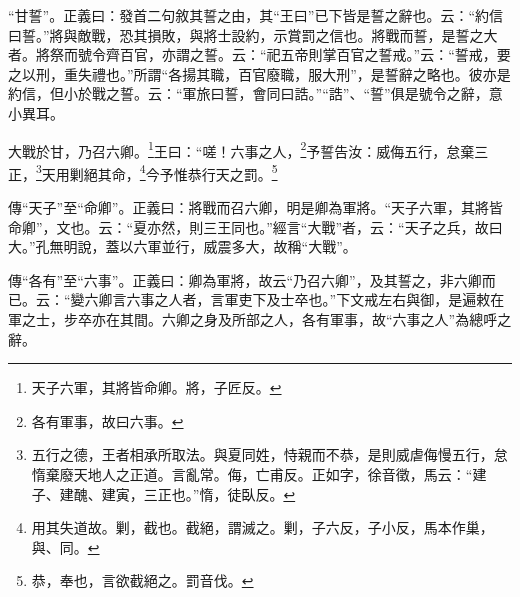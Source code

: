 {\noindent\shu{}\fzkt “甘誓”。正義曰：發首二句敘其誓之由，其“王曰”已下皆是誓之辭也。云：“約信曰誓。”將與敵戰，恐其損敗，與將士設約，示賞罰之信也。將戰而誓，是誓之大者。將祭而號令齊百官，亦謂之誓。云：“祀五帝則掌百官之誓戒。”云：“誓戒，要之以刑，重失禮也。”所謂“各揚其職，百官廢職，服大刑”，是誓辭之略也。彼亦是約信，但小於戰之誓。云：“軍旅曰誓，會同曰誥。”“誥”、“誓”俱是號令之辭，意小異耳。 \par}

大戰於甘，乃召六卿。\footnote{天子六軍，其將皆命卿。將，子匠反。}王曰：“嗟！六事之人，\footnote{各有軍事，故曰六事。}予誓告汝：威侮五行，怠棄三正，\footnote{五行之德，王者相承所取法。與夏同姓，恃親而不恭，是則威虐侮慢五行，怠惰棄廢天地人之正道。言亂常。侮，亡甫反。正如字，徐音徵，馬云：“建子、建醜、建寅，三正也。”惰，徒臥反。}天用剿絕其命，\footnote{用其失道故。剿，截也。截絕，謂滅之。剿，子六反，子小反，馬本作巢，與、同。}今予惟恭行天之罰。\footnote{恭，奉也，言欲截絕之。罰音伐。}


{\noindent\zhuan{}\fzbyks 傳“天子”至“命卿”。正義曰：將戰而召六卿，明是卿為軍將。“天子六軍，其將皆命卿”，文也。云：“夏亦然，則三王同也。”經言“大戰”者，云：“天子之兵，故曰大。”孔無明說，蓋以六軍並行，威震多大，故稱“大戰”。 \par}

{\noindent\zhuan{}\fzbyks 傳“各有”至“六事”。正義曰：卿為軍將，故云“乃召六卿”，及其誓之，非六卿而已。云：“變六卿言六事之人者，言軍吏下及士卒也。”下文戒左右與御，是遍敕在軍之士，步卒亦在其間。六卿之身及所部之人，各有軍事，故“六事之人”為總呼之辭。 \par}

